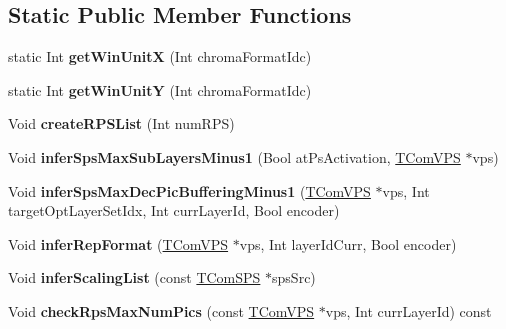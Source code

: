 \subsection*{Static Public Member Functions}
\begin{DoxyCompactItemize}
\item 
\mbox{\label{class_t_com_s_p_s_a81e4d8556270e01c354a7891fa98c976}} 
static Int {\bfseries get\+Win\+UnitX} (Int chroma\+Format\+Idc)
\item 
\mbox{\label{class_t_com_s_p_s_ae8e765e50adf0ca25b73a081dc933e0f}} 
static Int {\bfseries get\+Win\+UnitY} (Int chroma\+Format\+Idc)
\end{DoxyCompactItemize}
\begin{DoxyCompactItemize}
\item 
\mbox{\label{class_t_com_s_p_s_ae1ec7022106bcde1a8bde6c9ecc11ce9}} 
Void {\bfseries create\+R\+P\+S\+List} (Int num\+R\+PS)
\item 
\mbox{\label{class_t_com_s_p_s_a4878acef7ef1704037556d12f5b39b28}} 
Void {\bfseries infer\+Sps\+Max\+Sub\+Layers\+Minus1} (Bool at\+Ps\+Activation, \hyperlink{class_t_com_v_p_s}{T\+Com\+V\+PS} $\ast$vps)
\item 
\mbox{\label{class_t_com_s_p_s_a2012cd9b644b80eab71efb02903bfc9d}} 
Void {\bfseries infer\+Sps\+Max\+Dec\+Pic\+Buffering\+Minus1} (\hyperlink{class_t_com_v_p_s}{T\+Com\+V\+PS} $\ast$vps, Int target\+Opt\+Layer\+Set\+Idx, Int curr\+Layer\+Id, Bool encoder)
\item 
\mbox{\label{class_t_com_s_p_s_aaa856cd6e9b32818924820c822fdcc68}} 
Void {\bfseries infer\+Rep\+Format} (\hyperlink{class_t_com_v_p_s}{T\+Com\+V\+PS} $\ast$vps, Int layer\+Id\+Curr, Bool encoder)
\item 
\mbox{\label{class_t_com_s_p_s_ac878cf3d84091466c5679ddfff25e27a}} 
Void {\bfseries infer\+Scaling\+List} (const \hyperlink{class_t_com_s_p_s}{T\+Com\+S\+PS} $\ast$sps\+Src)
\item 
\mbox{\label{class_t_com_s_p_s_aa576d9aa786e6ce6635714bbdac249c3}} 
Void {\bfseries check\+Rps\+Max\+Num\+Pics} (const \hyperlink{class_t_com_v_p_s}{T\+Com\+V\+PS} $\ast$vps, Int curr\+Layer\+Id) const
\end{DoxyCompactItemize}


